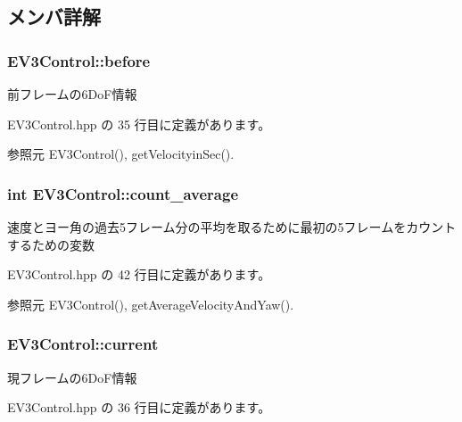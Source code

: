 \subsection{メンバ詳解}
\subsubsection[{before}]{ E\-V3\-Control\-::before}\label{class_e_v3_control_aadcbe063497900efa4d94b3a46edb688}


前フレームの6\-Do\-F情報 



 E\-V3\-Control.\-hpp の 35 行目に定義があります。



参照元 E\-V3\-Control(), get\-Velocityin\-Sec().

\subsubsection[{count\-\_\-average}]{\setlength{\rightskip}{0pt plus 5cm}int E\-V3\-Control\-::count\-\_\-average}\label{class_e_v3_control_a094ccebd1c4d6b6432743fd7284ebea8}


速度とヨー角の過去5フレーム分の平均を取るために最初の5フレームをカウントするための変数 



 E\-V3\-Control.\-hpp の 42 行目に定義があります。



参照元 E\-V3\-Control(), get\-Average\-Velocity\-And\-Yaw().

\subsubsection[{current}]{ E\-V3\-Control\-::current}\label{class_e_v3_control_a0407cbbddf22869f450b954d56c79c16}


現フレームの6\-Do\-F情報 



 E\-V3\-Control.\-hpp の 36 行目に定義があります。



